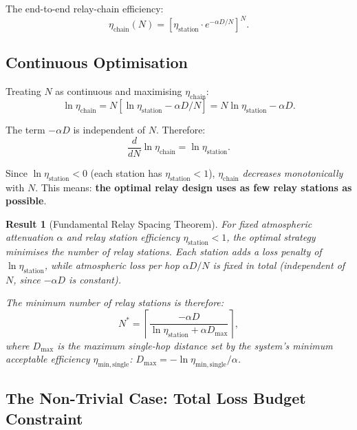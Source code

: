 \documentclass[aps,prd,twocolumn,superscriptaddress]{revtex4-2}
\newtheorem{result}{Result}
\begin{document}
The end-to-end relay-chain efficiency:
\begin{equation}
\eta_\mathrm{chain}(N) = \left[\eta_\mathrm{station}\cdot e^{-\alpha D/N}\right]^N.
\label{eq:chain_eff}
\end{equation}

\subsection{Continuous Optimisation}

Treating $N$ as continuous and maximising $\eta_\mathrm{chain}$:
\begin{equation}
\ln\eta_\mathrm{chain} = N\left[\ln\eta_\mathrm{station} - \alpha D/N\right]
= N\ln\eta_\mathrm{station} - \alpha D.
\label{eq:ln_chain}
\end{equation}

The term $-\alpha D$ is independent of $N$.  Therefore:
\begin{equation}
\frac{d}{dN}\ln\eta_\mathrm{chain} = \ln\eta_\mathrm{station}.
\label{eq:d_dN}
\end{equation}

Since $\ln\eta_\mathrm{station} < 0$ (each station has $\eta_\mathrm{station} < 1$),
$\eta_\mathrm{chain}$ \emph{decreases monotonically} with $N$.  This
means: \textbf{the optimal relay design uses as few relay stations as possible}.

\begin{result}[Fundamental Relay Spacing Theorem]
For fixed atmospheric attenuation $\alpha$ and relay station efficiency
$\eta_\mathrm{station} < 1$, the optimal strategy minimises the number
of relay stations.  Each station adds a loss penalty of $\ln\eta_\mathrm{station}$,
while atmospheric loss per hop $\alpha D/N$ is fixed in total
(independent of $N$, since $-\alpha D$ is constant).

The minimum number of relay stations is therefore:
\begin{equation}
\boxed{
N^* = \left\lceil\frac{-\alpha D}{\ln\eta_\mathrm{station} + \alpha D_\mathrm{max}}\right\rceil,
}
\label{eq:N_star}
\end{equation}
where $D_\mathrm{max}$ is the maximum single-hop distance set by
the system's minimum acceptable efficiency $\eta_\mathrm{min,single}$:
$D_\mathrm{max} = -\ln\eta_\mathrm{min,single}/\alpha$.
\end{result}

\subsection{The Non-Trivial Case: Total Loss Budget Constraint}
\end{document}
